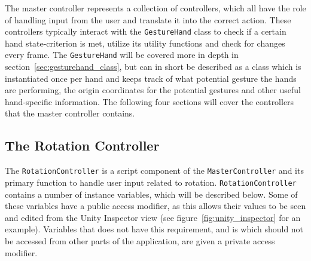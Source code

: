 The master controller represents a collection of controllers, which all have the role of handling input from the user and translate it into
the correct action. These controllers typically interact with the \texttt{GestureHand} class to check if a certain hand state-criterion
is met, utilize its utility functions and check for changes every frame. The \texttt{GestureHand} will be covered more in depth in section~\vref{sec:gesturehand_class}, 
but can in short be described as a class which is instantiated once per hand and keeps track of what potential gesture the hands are performing, the origin coordinates
for the potential gestures and other useful hand-specific information. 
The following four sections will cover the controllers that the master controller contains.

\subsection{The Rotation Controller}
The \texttt{RotationController} is a script component of the \texttt{MasterController} and its primary function to handle user input related to rotation.
\texttt{RotationController} contains a number of instance variables, which will be described below. Some of these variables have a public access modifier, as
this allows their values to be seen and edited from the Unity Inspector view (see figure~\vref{fig:unity_inspector} for an example). Variables that does not
have this requirement, and is which should not be accessed from other parts of the application, are given a private access modifier.

